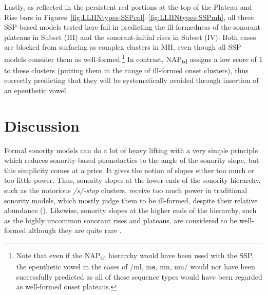 Lastly, as reflected in the persistent red portions at the top of the Plateau and Rise bars in Figures~\ref{fig:LLHNtypes-SSPcol}--\ref{fig:LLHNtypes-SSPmh}, all three SSP-based models tested here fail in predicting the ill-formedness of the sonorant plateaus in Subset (III) and the sonorant-initial rises in Subset (IV). Both cases are blocked from surfacing as complex clusters in MH, even though all SSP models consider them as well-formed.\footnote{Note that even if the NAP\textsubscript{td} hierarchy would have been used with the SSP, the epenthetic vowel in the cases of /ml, mʁ, mn, nm/ would not have been successfully predicted as all of these sequence types would have been regarded as well-formed onset plateaus.}
In contrast, NAP\textsubscript{td} assigns a low score of 1 to these clusters (putting them in the range of ill-formed onset clusters), thus correctly predicting that they will be systematically avoided through insertion of an epenthetic vowel.

\section{Discussion}\label{sec:discussMH}

Formal sonority models can do a lot of heavy lifting with a very simple principle which reduces sonority-based phonotactics to the angle of the sonority slope, but this simplicity comes at a price. It gives the notion of slopes either too much or too little power. Thus, sonority slopes at the lower ends of the sonority hierarchy, such as the notorious \emph{/s/-stop} clusters, receive too much power in traditional sonority models, which mostly judge them to be ill-formed, despite their relative abundance (\citealt{goad2016sonority, morelli2003relative, steriade1999alternativessk}).
Likewise, sonority slopes at the higher ends of the hierarchy, such as the highly uncommon sonorant rises and plateaus, are considered to be well-formed although they are quite rare \citep{greenberg1978some}.

